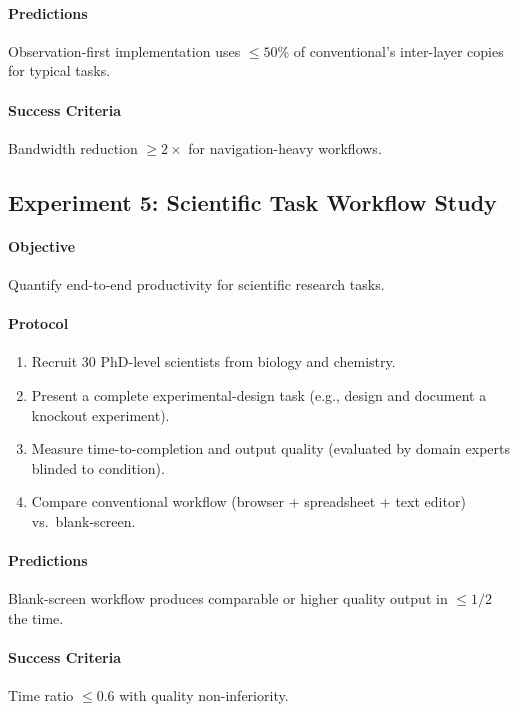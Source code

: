 \documentclass[11pt,twocolumn,a4paper]{article}
\theoremstyle{definition}
\theoremstyle{remark}
\begin{document}
\paragraph{Predictions}
Observation-first implementation uses $\leq 50\%$ of conventional's inter-layer copies for typical tasks.

\paragraph{Success Criteria}
Bandwidth reduction $\geq 2\times$ for navigation-heavy workflows.

\subsection{Experiment 5: Scientific Task Workflow Study}

\paragraph{Objective} Quantify end-to-end productivity for scientific research tasks.

\paragraph{Protocol}
\begin{enumerate}
    \item Recruit 30 PhD-level scientists from biology and chemistry.
    \item Present a complete experimental-design task (e.g., design and document a knockout experiment).
    \item Measure time-to-completion and output quality (evaluated by domain experts blinded to condition).
    \item Compare conventional workflow (browser + spreadsheet + text editor) vs.\ blank-screen.
\end{enumerate}

\paragraph{Predictions}
Blank-screen workflow produces comparable or higher quality output in $\leq 1/2$ the time.

\paragraph{Success Criteria}
Time ratio $\leq 0.6$ with quality non-inferiority.
\end{document}
